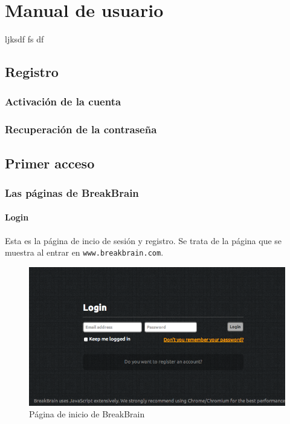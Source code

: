 \chapter{Manual de usuario}
\label{chap::manual}

ljksdf
fs
df

\section{Registro}

\subsection{Activación de la cuenta}

\subsection{Recuperación de la contraseña}

\section{Primer acceso}

\subsection{Las páginas de BreakBrain}

\subsubsection{Login}

Esta es la página de incio de sesión y registro. Se trata de la página que se muestra al entrar en {\tt www.breakbrain.com}.

\begin{figure}[h]
  \begin{center}
    \includegraphics[width=\textwidth]{./images/page-login.png}
  \end{center}  
  \caption{Página de inicio de BreakBrain}
  \label{fig::page-login}
\end{figure}

